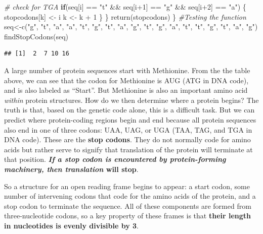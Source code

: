 \documentclass[
]{article}
\newenvironment{Shaded}{\begin{snugshade}}{\end{snugshade}}
\newcommand{\CommentTok}[1]{\textcolor[rgb]{0.56,0.35,0.01}{\textit{#1}}}
\newcommand{\ControlFlowTok}[1]{\textcolor[rgb]{0.13,0.29,0.53}{\textbf{#1}}}
\newcommand{\DecValTok}[1]{\textcolor[rgb]{0.00,0.00,0.81}{#1}}
\newcommand{\FunctionTok}[1]{\textcolor[rgb]{0.00,0.00,0.00}{#1}}
\newcommand{\NormalTok}[1]{#1}
\newcommand{\OtherTok}[1]{\textcolor[rgb]{0.56,0.35,0.01}{#1}}
\newcommand{\SpecialCharTok}[1]{\textcolor[rgb]{0.00,0.00,0.00}{#1}}
\newcommand{\StringTok}[1]{\textcolor[rgb]{0.31,0.60,0.02}{#1}}
\begin{document}
\begin{Shaded}
\begin{Highlighting}[]
    \CommentTok{\# check for TGA}
    \ControlFlowTok{if}\NormalTok{(seq[i] }\SpecialCharTok{==} \StringTok{"t"} \SpecialCharTok{\&\&}\NormalTok{ seq[i}\SpecialCharTok{+}\DecValTok{1}\NormalTok{] }\SpecialCharTok{==} \StringTok{"g"} \SpecialCharTok{\&\&}\NormalTok{ seq[i}\SpecialCharTok{+}\DecValTok{2}\NormalTok{] }\SpecialCharTok{==} \StringTok{"a"}\NormalTok{) \{}
\NormalTok{      stopcodons[k] }\OtherTok{\textless{}{-}}\NormalTok{ i}
\NormalTok{      k }\OtherTok{\textless{}{-}}\NormalTok{ k }\SpecialCharTok{+} \DecValTok{1}
\NormalTok{    \}}
\NormalTok{  \}}
  \FunctionTok{return}\NormalTok{(stopcodons)}
\NormalTok{\}}
\CommentTok{\#Testing the function}
\NormalTok{seq}\OtherTok{\textless{}{-}}\FunctionTok{c}\NormalTok{(}\StringTok{"g"}\NormalTok{, }\StringTok{"t"}\NormalTok{, }\StringTok{"a"}\NormalTok{, }\StringTok{"a"}\NormalTok{, }\StringTok{"t"}\NormalTok{, }\StringTok{"g"}\NormalTok{, }\StringTok{"t"}\NormalTok{, }\StringTok{"a"}\NormalTok{, }\StringTok{"g"}\NormalTok{, }\StringTok{"t"}\NormalTok{, }\StringTok{"g"}\NormalTok{, }\StringTok{"a"}\NormalTok{, }\StringTok{"t"}\NormalTok{, }\StringTok{"t"}\NormalTok{, }\StringTok{"g"}\NormalTok{, }\StringTok{"t"}\NormalTok{, }\StringTok{"a"}\NormalTok{, }\StringTok{"g"}\NormalTok{)}
\FunctionTok{findStopCodons}\NormalTok{(seq)}
\end{Highlighting}
\end{Shaded}

\begin{verbatim}
## [1]  2  7 10 16
\end{verbatim}

A large number of protein sequences start with Methionine. From the the
table above, we can see that the codon for Methionine is AUG (ATG in DNA
code), and is also labeled as ``Start''. But Methionine is also an
important amino acid \emph{within} protein structures. How do we then
determine where a protein begins? The truth is that, based on the
genetic code alone, this is a difficult task. But we can predict where
protein-coding regions begin and end because all protein sequences also
end in one of three codons: UAA, UAG, or UGA (TAA, TAG, and TGA in DNA
code). These are the \textbf{stop codons}. They do not normally code for
amino acids but rather serve to signify that translation of the protein
will terminate at that position. \textbf{\emph{If a stop codon is
encountered by protein-forming machinery, then translation }will stop}.

So a structure for an open reading frame begins to appear: a start
codon, some number of intervening codons that code for the amino acids
of the protein, and a stop codon to terminate the sequence. All of these
components are formed from three-nucleotide codons, so a key property of
these frames is that \textbf{their length in nucleotides is evenly
divisible by 3}.\span
\end{document}
